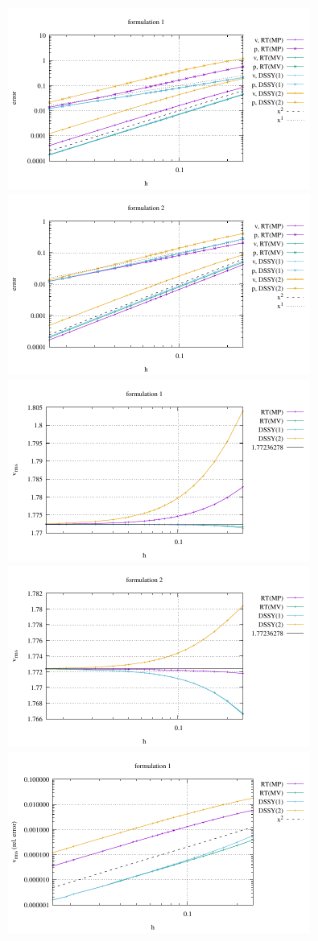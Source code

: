 \begin{itemize}
\begin{center}
\includegraphics[width=8cm]{python_codes/fieldstone_77/results/db2D/errors_form1}
\includegraphics[width=8cm]{python_codes/fieldstone_77/results/db2D/errors_form2}\\
\includegraphics[width=8cm]{python_codes/fieldstone_77/results/db2D/vrms_form1}
\includegraphics[width=8cm]{python_codes/fieldstone_77/results/db2D/vrms_form2}\\
\includegraphics[width=8cm]{python_codes/fieldstone_77/results/db2D/vrms_form1_relerror}

\end{center}
\end{itemize}
